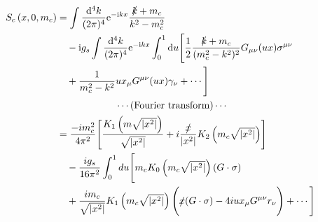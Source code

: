 \begin{equation}
    \begin{aligned}
        S_{c}\left(x, 0, m_c\right) & =\int \frac{\mathrm{d}^4 k}{(2 \pi)^4} \mathrm{e}^{-\mathrm{i} k x} \frac{\slashed{k}+m_c}{k^2-m_c^2}                                                                                                     \\
                                    & \quad -\mathrm{i} g_s \int \frac{\mathrm{d}^4 k}{(2 \pi)^4} \mathrm{e}^{-\mathrm{i} k x} \int_0^1 \mathrm{d} u\Biggl[ \frac{1}{2} \frac{\slashed{k}+m_c}{(m_c^2-k^2)^2} G_{\mu \nu}(u x) \sigma^{\mu \nu} \\
                                    & \quad +\frac{1}{m_c^2-k^2} u x_\mu G^{\mu \nu}(u x) \gamma_\nu + \cdots \Biggr]                                                                                                                           \\
                                    & ~~~~~~~~~~~~~~~~~~\cdots\text{(Fourier transform)}\cdots                                                                                                                                                  \\
                                    & =\frac{-i m_c^2}{4 \pi^2}\Biggl[\frac{K_1\left(m \sqrt{|x^2|}\right)}{\sqrt{|x^2|}}+i \frac{\slashed{x}}{|x^2|} K_2\left(m_c \sqrt{|x^2|}\right)\Biggr]                                                   \\
                                    & \quad -\frac{i g_s}{16 \pi^2} \int_0^1 d u\Biggl[ m_c K_0\left(m_c \sqrt{|x^2|}\right)(G \cdot \sigma)                                                                                                    \\
                                    & \quad +\frac{i m_c}{\sqrt{|x^2|}} K_1\left(m_c \sqrt{|x^2|}\right)\Biggl(\slashed{x} (G \cdot \sigma)-4 i u x_\mu G^{\mu \nu} r_\nu\Biggr)+\cdots \Biggr]                                                 \\
    \end{aligned}
    \label{eq:propagator_ccbar}
\end{equation}

